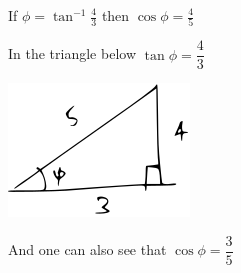 \documentclass[14pt,fleqn]{extarticle}
\newcommand\angb{\tan^{-1}\frac{4}{3}}
\begin{document}
 
\begin{snippet}
    
    \incorrect
    
    If $\phi = \angb$ then $\cos\phi=\frac{4}{5}$ 
    
    \reason
    
    In the triangle below $\tan\phi = \dfrac{4}{3}$ 
    
    \begin{center}
\includegraphics[scale=1.4]{74-A.svg}
\end{center}
    And one can also see that $\cos\phi = \dfrac{3}{5}$ 
    
\end{snippet} 
\end{document}
